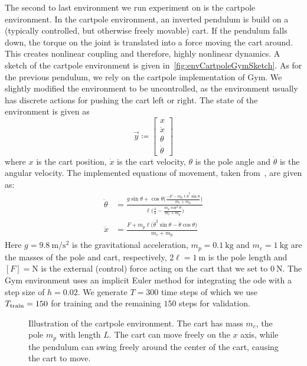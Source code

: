 			The second to last environment we run experiment on is the cartpole environment. In the cartpole environment, an inverted pendulum is build on a (typically controlled, but otherwise freely movable) cart. If the pendulum falls down, the torque on the joint is translated into a force moving the cart around. This creates nonlinear coupling and therefore, highly nonlinear dynamics. A sketch of the cartpole environment is given in~\autoref{fig:envCartpoleGymSketch}. As for the previous pendulum, we rely on the cartpole implementation of Gym. We slightly modified the environment to be uncontrolled, as the environment usually has discrete actions for pushing the cart left or right. The state of the environment is given as
			\begin{equation*}
				\vec{y} \coloneqq
					\begin{bmatrix}
						x \\
						\dot{x} \\
						\theta \\
						\dot{\theta}
					\end{bmatrix}
			\end{equation*}
			where \(x\) is the cart position, \(\dot{x}\) is the cart velocity, \(\theta\) is the pole angle and \(\dot{\theta}\) is the angular velocity. The implemented equations of movement, taken from~\cite{florianCorrectEquationsDynamics2005}, are given as:
			\begin{align*}
				\ddot{\theta} &= \frac{g \sin\theta + \cos\theta \Big(\! \frac{-F - m_p \ell \dot{\theta}^2 \sin\theta}{m_c + m_p} \!\Big)}{\ell \Big(\! \frac{4}{3} - \frac{m_p \cos^2\theta}{m_c + m_p} \!\Big)} \\
				\ddot{x} &= \frac{F + m_p \ell \big( \dot{\theta}^2 \sin\theta - \ddot{\theta} \cos\theta \big)}{m_c + m_p}
			\end{align*}
			Here \( g = \SI{9.8}{\meter\per\second\squared} \) is the gravitational acceleration, \( m_p = \SI{0.1}{\kilogram} \) and \( m_c = \SI{1}{\kilogram} \) are the masses of the pole and cart, respectively, \( 2\ell = \SI{1}{\meter} \) is the pole length and \( [F] = \si{\newton} \) is the external (control) force acting on the cart that we set to \( \SI{0}{\newton} \). The Gym environment uses an implicit Euler method for integrating the \ac{ode} with a step size of \( h = 0.02 \). We generate \( T = 300 \) time steps of which we use \( T_{\mathrm{train}} = 150 \) for training and the remaining \(150\) steps for validation.

			\begin{figure}
				\centering
				\tikzCartpole
				\caption[Illustration of the cartpole environment]{Illustration of the cartpole environment. The cart has mass \(m_c\), the pole \(m_p\) with length \(L\). The cart can move freely on the \(x\) axis, while the pendulum can swing freely around the center of the cart, causing the cart to move.}
				\label{fig:envCartpoleGymSketch}
			\end{figure}

